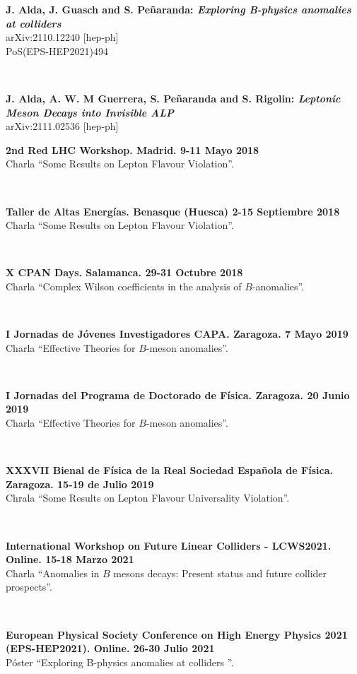 \documentclass[combined.tex]{subfiles}
\begin{document}
\textbf{J. Alda, J. Guasch and S. Peñaranda: \textit{Exploring B-physics anomalies at colliders}}\\
arXiv:2110.12240 [hep-ph]\\
PoS(EPS-HEP2021)494

~

\textbf{J. Alda, A. W. M Guerrera, S. Peñaranda and S. Rigolin: \textit{Leptonic Meson Decays into Invisible ALP}}\\
arXiv:2111.02536 [hep-ph]


\hspace{\parindent}\textbf{2nd Red LHC Workshop. Madrid. 9-11 Mayo 2018}\\
Charla ``Some Results on Lepton Flavour Violation''.

~

\textbf{Taller de Altas Energías. Benasque (Huesca) 2-15 Septiembre 2018}\\
Charla ``Some Results on Lepton Flavour Violation''.

~

\textbf{X CPAN Days. Salamanca. 29-31 Octubre 2018}\\
Charla ``Complex Wilson coefficients in the analysis of $B$-anomalies''.

~

\textbf{I Jornadas de Jóvenes Investigadores CAPA. Zaragoza. 7 Mayo 2019}\\
Charla ``Effective Theories for $B$-meson anomalies''.

~

\textbf{I Jornadas del Programa de Doctorado de Física. Zaragoza. 20 Junio 2019}\\
Charla ``Effective Theories for $B$-meson anomalies''.

~

\textbf{XXXVII Bienal de Física de la Real Sociedad Española de Física. Zaragoza. 15-19 de Julio 2019}\\
Chrala ``Some Results on Lepton Flavour Universality Violation''.

~

\textbf{International Workshop on Future Linear Colliders - LCWS2021. Online. 15-18 Marzo 2021}\\
Charla ``Anomalies in $B$ mesons decays: Present status and future collider prospects''.

~

\textbf{European Physical Society Conference on High Energy Physics 2021 (EPS-HEP2021). Online. 26-30 Julio 2021}\\
Póster ``Exploring B-physics anomalies at colliders ''.
\end{document}
